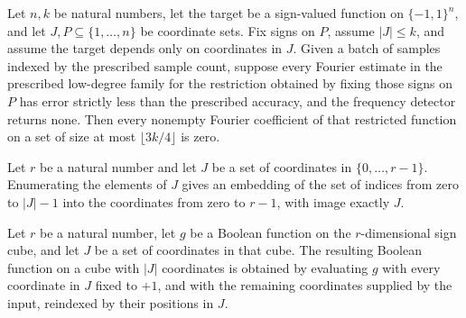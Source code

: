 \begin{theorem}
\label{FABL.isCorrelationImmune_of_no_lowDegreeJuntaDetection}
\leanok
{}
Let $n,k$ be natural numbers, let the target be a sign-valued function on $\{-1,1\}^n$,
and let $J,P\subseteq\{1,\ldots,n\}$ be coordinate sets. Fix signs on $P$, assume
$|J|\le k$, and assume the target depends only on coordinates in $J$. Given a batch of
samples indexed by the prescribed sample count, suppose every Fourier estimate in the
prescribed low-degree family for the restriction obtained by fixing those signs on $P$
has error strictly less than the prescribed accuracy, and the frequency detector returns
none. Then every nonempty Fourier coefficient of that restricted function on a set of
size at most $\lfloor 3k/4\rfloor$ is zero.
\end{theorem}

\begin{definition}
\label{FABL.juntaWitnessCoordinateEmbedding}
\leanok
Let $r$ be a natural number and let $J$ be a set of coordinates in $\{0,\ldots,r-1\}$.
Enumerating the elements of $J$ gives an embedding of the set of indices from zero to
$|J|-1$ into the coordinates from zero to $r-1$, with image exactly $J$.
\end{definition}

\begin{definition}
\label{FABL.juntaWitnessCore}
\leanok
{}
Let $r$ be a natural number, let $g$ be a Boolean function on the $r$-dimensional sign
cube, and let $J$ be a set of coordinates in that cube. The resulting Boolean function
on a cube with $|J|$ coordinates is obtained by evaluating $g$ with every coordinate in
$J$ fixed to $+1$, and with the remaining coordinates supplied by the input, reindexed
by their positions in $J$.
\end{definition}

